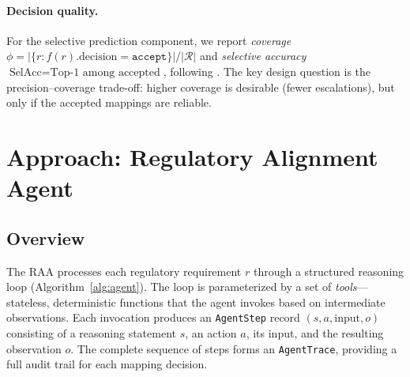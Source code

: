 \documentclass[a4paper,fleqn]{cas-sc}
\begin{document}
\paragraph{Decision quality.}
For the selective prediction component, we report \emph{coverage} $\phi = |\{r : f(r).\text{decision} = \texttt{accept}\}| / |\mathcal{R}|$ and \emph{selective accuracy} $\text{SelAcc} = \text{Top-1 among accepted}$, following \citet{Geifman2017}.
The key design question is the precision--coverage trade-off: higher coverage is desirable (fewer escalations), but only if the accepted mappings are reliable.


\section{Approach: Regulatory Alignment Agent}
\label{sec:architecture}

\subsection{Overview}

The RAA processes each regulatory requirement $r$ through a structured reasoning loop (Algorithm~\ref{alg:agent}).
The loop is parameterized by a set of \emph{tools}---stateless, deterministic functions that the agent invokes based on intermediate observations.
Each invocation produces an \texttt{AgentStep} record $(s, a, \text{input}, o)$ consisting of a reasoning statement $s$, an action $a$, its input, and the resulting observation $o$.
The complete sequence of steps forms an \texttt{AgentTrace}, providing a full audit trail for each mapping decision.
\end{document}
